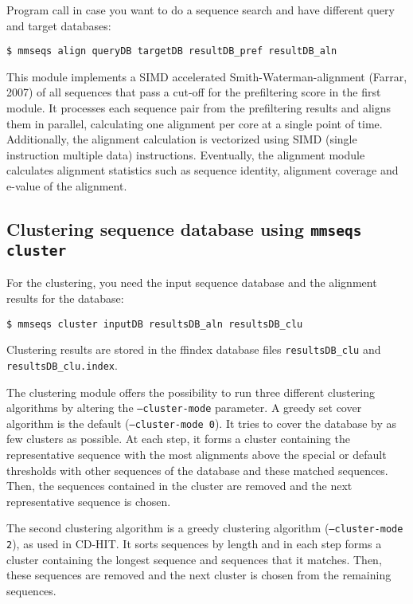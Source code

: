 \documentclass[11pt,a4paper]{scrreprt}
\begin{document}
Program call in case you want to do a sequence search and have different query and target databases:

\begin{verbatim}
$ mmseqs align queryDB targetDB resultDB_pref resultDB_aln 
\end{verbatim}

This module implements a SIMD accelerated Smith-Waterman-alignment (Farrar, 2007) of all sequences that pass a cut-off for the prefiltering score in the first module. It processes each sequence pair from the prefiltering results and aligns them in parallel, calculating one alignment per core at a single point of time. Additionally, the alignment calculation is vectorized using SIMD (single instruction multiple data) instructions. Eventually, the alignment module calculates alignment statistics such as sequence identity, alignment coverage and e-value of the alignment.
\subsection{Clustering sequence database using \texttt{mmseqs cluster}} \label{sub:Clustering_module}
For the clustering, you need the input sequence database and the alignment results for the database:

\begin{verbatim}
$ mmseqs cluster inputDB resultsDB_aln resultsDB_clu
\end{verbatim}

Clustering results are stored in the ffindex database files \texttt{resultsDB\_clu} and \texttt{resultsDB\_clu.index}.

The clustering module offers the possibility to run three different clustering algorithms by altering the \texttt{--cluster-mode} parameter. A greedy set cover algorithm is the default (\texttt{--cluster-mode 0}). It tries to cover the database by as few clusters as possible. At each step, it forms a cluster containing the representative sequence with the most alignments above the special or default thresholds with other sequences of the database and these matched sequences. Then, the sequences contained in the cluster are removed and the next representative sequence is chosen.

The second clustering algorithm is a greedy clustering algorithm (\texttt{--cluster-mode 2}), as used in CD-HIT. It sorts sequences by length and in each step forms a cluster containing the longest sequence and sequences that it matches. Then, these sequences are removed and the next cluster is chosen from the remaining sequences.
\end{document}
